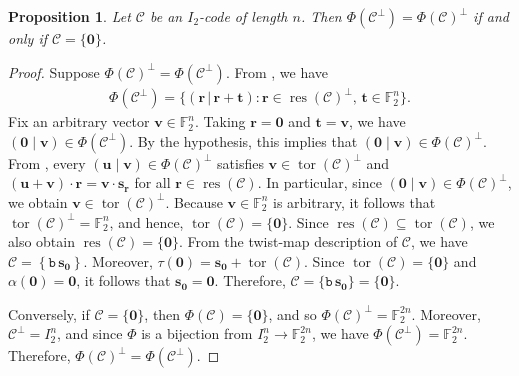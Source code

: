 \documentclass[12pt]{article}
\newtheorem{proposition}[proposition]{Proposition}
\theoremstyle{definition}
\theoremstyle{plain}
\newcommand{\Blue}[1]{{ \color{blue} #1}}
\begin{document}
\begin{proposition}
Let $\mathcal{C}$ be an $I_2$-code of length $n$. Then $ \Phi (\mathcal{C}^\perp ) = \Phi (\mathcal{C})^\perp$ if and only if  $\mathcal{C} =  \{ \mathbf{0}  \}$.
\end{proposition}

\begin{proof}
Suppose $\Phi(\mathcal{C})^\perp = \Phi(\mathcal{C}^\perp)$.
From , we have
\begin{align*}
\Phi(\mathcal{C}^\perp) = \{(\mathbf{r} \, | \,   \mathbf{r}  +  \mathbf{t}) \mathrel{:}   \mathbf{r}  \in\operatorname{res} ( \mathcal{C} )^\perp, \,  \mathbf{t}  \in  \mathbb{F} _2^n \}  .
\end{align*}
Fix an arbitrary vector $\mathbf{v} \in \mathbb{F}_2^n$. Taking
$\mathbf{r} = \mathbf{0}$ and $\mathbf{t} = \mathbf{v}$, we have
$
(\mathbf{0} \mid \mathbf{v}) \in \Phi(\mathcal{C}^\perp)
$.
By the hypothesis, this implies that
$
(\mathbf{0} \mid \mathbf{v}) \in \Phi(\mathcal{C})^\perp
$.
From , every $(\mathbf{u} \mid \mathbf{v}) \in \Phi(\mathcal{C})^\perp$ satisfies
$
\mathbf{v}  \in \operatorname{tor}(\mathcal{C})^\perp
$
and
$
(\mathbf{u} + \mathbf{v}) \cdot \mathbf{r}
= \mathbf{v} \cdot \mathbf{s}_{\mathbf{r}}
$
for all $\mathbf{r} \in \operatorname{res}(\mathcal{C})$.
In particular, since $(\mathbf{0} \mid \mathbf{v}) \in \Phi(\mathcal{C})^\perp$,
we obtain
$
\mathbf{v} \in \operatorname{tor}(\mathcal{C})^\perp
$.
Because $\mathbf{v} \in \mathbb{F}_2^n$ is arbitrary, it follows that
$
\operatorname{tor}(\mathcal{C})^\perp = \mathbb{F}_2^n
$,
and hence,
$
\operatorname{tor}(\mathcal{C}) = \{\mathbf{0}\}
$.
Since $\operatorname{res}(\mathcal{C}) \subseteq \operatorname{tor}(\mathcal{C})$,
we also obtain
$
\operatorname{res}(\mathcal{C}) = \{\mathbf{0}\}
$.
From the twist-map description of $\mathcal{C}$, we have
$
\mathcal{C}
=
\left\{
\mathtt{b}\,\mathbf{s}_{\mathbf{0}}
\right\}
$.
Moreover,
$
\tau (\mathbf{0}) = \mathbf{s}_{\mathbf{0}} + \operatorname{tor}(\mathcal{C}) .
$
Since $\operatorname{tor}(\mathcal{C}) = \{\mathbf{0}\}$ and $\alpha (\mathbf{0}) = \mathbf{0}$, it follows that
$
\mathbf{s}_{\mathbf{0}} = \mathbf{0}
$.
Therefore,
$
\mathcal{C} = \{\mathtt{b}\,\mathbf{s}_{\mathbf{0}}\} = \{\mathbf{0}\}
$.




Conversely, if $\mathcal{C} = \{ \mathbf{0} \}$, then
$
\Phi(\mathcal{C}) = \{ \mathbf{0} \}
$,
and so
$
\Phi(\mathcal{C})^\perp = \mathbb{F}_2^{2n}
$.
Moreover, $\mathcal{C}^\perp = I_2^n$, and since $\Phi$ is a bijection from $I_2^n \to \mathbb{F}_2^{2n}$, we have
$
\Phi(\mathcal{C}^\perp) = \mathbb{F}_2^{2n}
$.
Therefore,
$
\Phi(\mathcal{C})^\perp = \Phi(\mathcal{C}^\perp)
$.
\end{proof}
\end{document}
